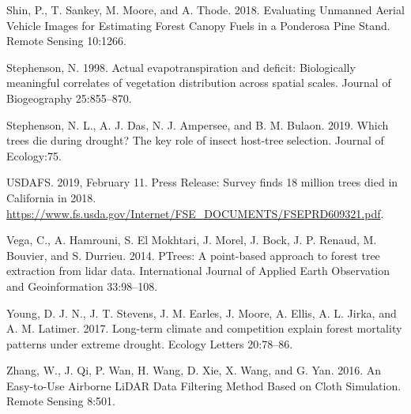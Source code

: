 \documentclass[]{article}
\begin{document}
\hypertarget{ref-shin2018}{}
Shin, P., T. Sankey, M. Moore, and A. Thode. 2018. Evaluating Unmanned
Aerial Vehicle Images for Estimating Forest Canopy Fuels in a Ponderosa
Pine Stand. Remote Sensing 10:1266.

\hypertarget{ref-stephenson1998}{}
Stephenson, N. 1998. Actual evapotranspiration and deficit: Biologically
meaningful correlates of vegetation distribution across spatial scales.
Journal of Biogeography 25:855--870.

\hypertarget{ref-stephenson2019}{}
Stephenson, N. L., A. J. Das, N. J. Ampersee, and B. M. Bulaon. 2019.
Which trees die during drought? The key role of insect host-tree
selection. Journal of Ecology:75.

\hypertarget{ref-usdafs2019}{}
USDAFS. 2019, February 11. Press Release: Survey finds 18 million trees
died in California in 2018.
\url{https://www.fs.usda.gov/Internet/FSE_DOCUMENTS/FSEPRD609321.pdf}.

\hypertarget{ref-vega2014}{}
Vega, C., A. Hamrouni, S. El Mokhtari, J. Morel, J. Bock, J. P. Renaud,
M. Bouvier, and S. Durrieu. 2014. PTrees: A point-based approach to
forest tree extraction from lidar data. International Journal of Applied
Earth Observation and Geoinformation 33:98--108.

\hypertarget{ref-young2017}{}
Young, D. J. N., J. T. Stevens, J. M. Earles, J. Moore, A. Ellis, A. L.
Jirka, and A. M. Latimer. 2017. Long-term climate and competition
explain forest mortality patterns under extreme drought. Ecology Letters
20:78--86.

\hypertarget{ref-zhang2016}{}
Zhang, W., J. Qi, P. Wan, H. Wang, D. Xie, X. Wang, and G. Yan. 2016. An
Easy-to-Use Airborne LiDAR Data Filtering Method Based on Cloth
Simulation. Remote Sensing 8:501.
\end{document}
